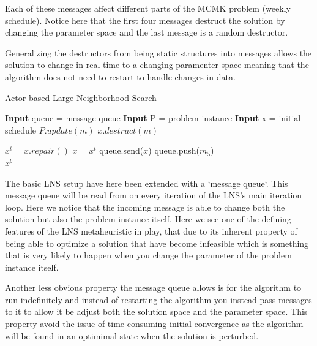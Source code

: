 \documentclass[preprint,12pt,authoryear]{elsarticle}
\begin{document}
Each of these messages affect different parts of the MCMK problem (weekly schedule). Notice
here that the first four messages destruct the solution by changing the parameter space and the last message is 
a random destructor.

Generalizing the destructors from being static structures into messages
allows the solution to change in real-time to a changing paramenter space meaning
that the algorithm does not need to restart to handle changes in data. 

\begin{algorithm}[H]
\caption{Actor-based Large Neighborhood Search}  \label{algo1}
\begin{algorithmic}[1]
\State \textbf{Input} queue = message queue
\State \textbf{Input} P     = problem instance
\State \textbf{Input} x     = initial schedule
		\State $P.update(m)$
        \State $x.destruct(m)$
    \EndWhile
	
    \State $x^t = x.repair()$
                                 \label{alg:objective_start}
        \State $x = x^t$
		\State queue.send($x$)
    \EndIf                                           \label{alg:objective_end}
	\State queue.push($m_5$)
\EndWhile\\
\Return $x^b$
\end{algorithmic}
\end{algorithm}

The basic LNS setup have here been extended with a `message queue`. This message queue will be read from on every iteration of the LNS's main iteration loop. Here we notice that the 
incoming message is able to change both the solution but also the problem instance itself. Here we see one of the defining features of the LNS metaheuristic in play, that due to its inherent 
property of being able to optimize a solution that have become infeasible which is something that is very likely to happen when you change the parameter of the problem instance itself. 

Another less obvious property the message queue allows is for the algorithm to run indefinitely and instead of restarting the algorithm you instead pass 
messages to it to allow it be adjust both the solution space and the parameter space.
This property avoid the issue of time consuming initial convergence as the algorithm will be found in an optimimal state when the solution is perturbed.  
\end{document}
